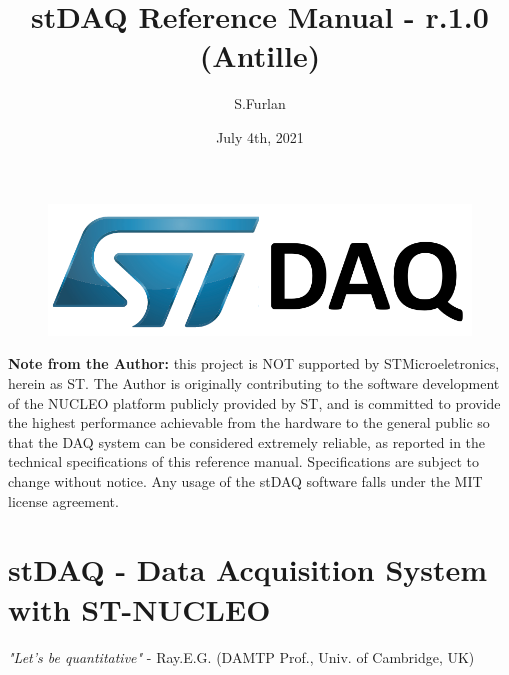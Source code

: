 \documentclass[letterpaper,10pt,english]{hitec}
\title{stDAQ Reference Manual - r.1.0 (Antille)}
\date{July 4th, 2021}
\author{S.Furlan}
\begin{document}
\maketitle

\vspace{1cm}

\begin{figure}[ht]
\includegraphics[scale=0.6]{../img/stDAQ_logo.png}
\label{fig:stDAQ_logo}
\end{figure}

\vspace{6cm}
\hrulefill

\small
\textbf{Note from the Author:} this project is NOT supported by STMicroeletronics, herein as ST.
The Author is originally contributing to the software development of the NUCLEO platform publicly provided by ST, and is committed to provide the highest performance achievable from the hardware to the general public so that the DAQ system can be considered extremely reliable, as reported in the technical specifications of this reference manual. Specifications are subject to change without notice.
Any usage of the stDAQ software falls under the MIT license agreement.
\normalsize

\blinddocument
\newpage

\tableofcontents

\newpage

\section{stDAQ - Data Acquisition System with ST-NUCLEO}

\begin{flushright}
\textit{"Let's be quantitative"} - Ray.E.G. (DAMTP Prof., Univ. of Cambridge, UK)
\end{flushright}

\vskip 0.5cm
\end{document}
